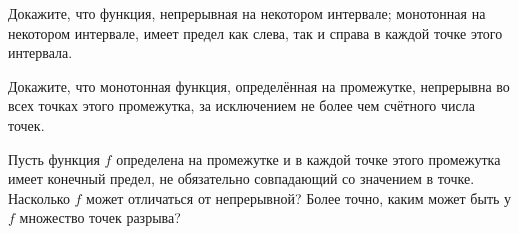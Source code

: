 \documentclass[a4paper,12pt]{article}
\begin{document}
 Докажите, что функция,  непрерывная на некотором интервале;  монотонная на
некотором интервале, имеет предел как слева, так и справа в каждой точке этого интервала.

 Докажите, что монотонная функция, определённая на промежутке, непрерывна во всех точках
этого промежутка, за исключением не более чем счётного числа точек.

 Пусть функция $f$ определена на промежутке и в каждой точке этого
промежутка имеет конечный предел, не обязательно совпадающий со значением в точке. Насколько $f$
может отличаться от непрерывной? Более точно, каким может быть у $f$ множество точек разрыва?



\vfill
{}
\end{document}
